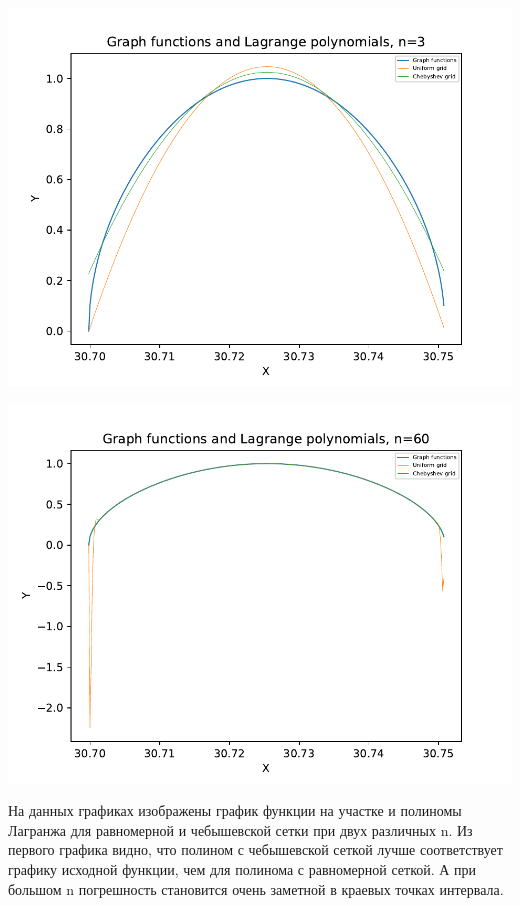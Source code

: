\includegraphics[scale=0.75]{3.pdf}

\includegraphics[scale=0.75]{4.pdf}

На данных графиках изображены график функции на участке и полиномы Лагранжа для равномерной и чебышевской сетки при двух различных n. Из первого графика видно, что полином с чебышевской сеткой лучше соответствует графику исходной функции, чем для полинома с равномерной сеткой. А при большом n погрешность становится очень заметной в краевых точках интервала.

\subsection{ \begin{math} 
		[\sqrt{700*\pi}; \sqrt{701*\pi}]
\end{math}}

